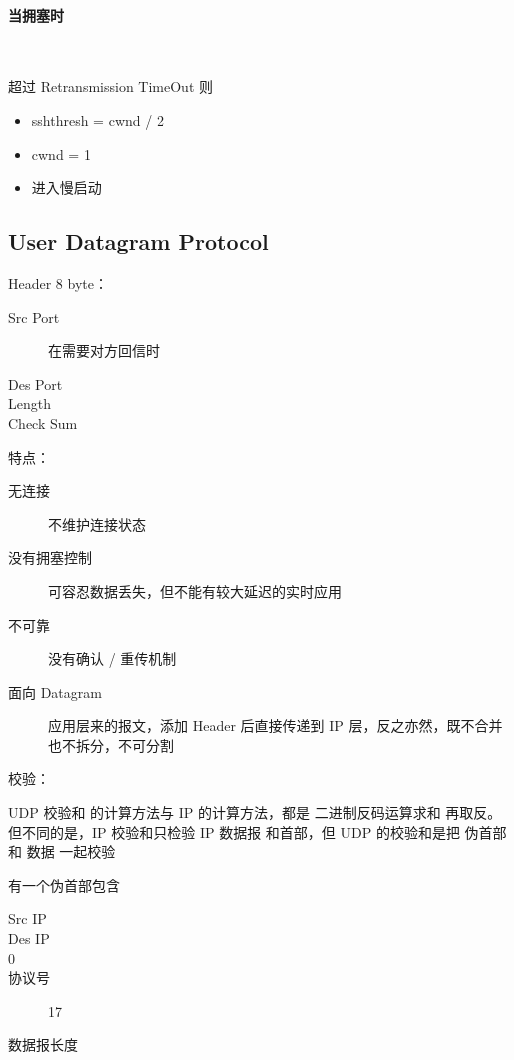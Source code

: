 \documentclass[11pt,journal,compsoc]{IEEEtran}
\begin{document}
\paragraph{当拥塞时} ~

超过 Retransmission TimeOut 则

\begin{itemize}
    \item sshthresh = cwnd / 2
    \item cwnd = 1
    \item 进入慢启动
\end{itemize}


\subsection{User Datagram Protocol}

Header 8 byte：

\begin{description}
    \item[Src Port] 在需要对方回信时

    \item[Des Port] 

    \item[Length] 

    \item[Check Sum] 
\end{description}

特点：

\begin{description}
    \item[无连接] 不维护连接状态

    \item[没有拥塞控制] 可容忍数据丢失，但不能有较大延迟的实时应用

    \item[不可靠] 没有确认 / 重传机制

    \item[面向 Datagram] 应用层来的报文，添加 Header 后直接传递到 IP 层，反之亦然，既不合并也不拆分，不可分割
\end{description}

校验：

UDP 校验和 的计算方法与 IP 的计算方法，都是 二进制反码运算求和 再取反。但不同的是，IP 校验和只检验 IP 数据报 和首部，但 UDP 的校验和是把 伪首部 和 数据 一起校验

有一个伪首部包含

\begin{description}
    \item[Src IP]

    \item[Des IP] 

    \item[0] 

    \item[协议号] 17

    \item[数据报长度] 
\end{description}
\end{document}
